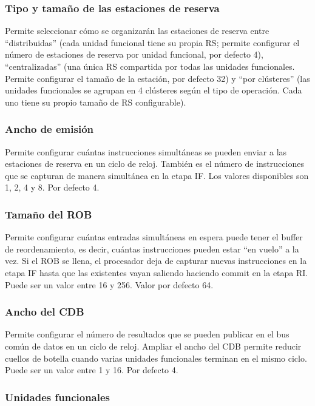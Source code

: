 \documentclass[../main.tex]{subfiles}
\begin{document}
\subsubsection*{Tipo y tamaño de las estaciones de reserva}

Permite seleccionar cómo se organizarán las estaciones de reserva entre ``distribuidas'' (cada unidad funcional tiene su propia RS; permite configurar el número de estaciones de reserva por unidad funcional, por defecto 4), ``centralizadas'' (una única RS compartida por todas las unidades funcionales. Permite configurar el tamaño de la estación, por defecto 32) y ``por clústeres'' (las unidades funcionales se agrupan en 4 clústeres según el tipo de operación. Cada uno tiene su propio tamaño de RS configurable).

\subsubsection*{Ancho de emisión}

Permite configurar cuántas instrucciones simultáneas se pueden enviar a las estaciones de reserva en un ciclo de reloj. También es el número de instrucciones que se capturan de manera simultánea en la etapa IF. Los valores disponibles son 1, 2, 4 y 8. Por defecto 4.

\subsubsection*{Tamaño del ROB}

Permite configurar cuántas entradas simultáneas en espera puede tener el buffer de reordenamiento, es decir, cuántas instrucciones pueden estar ``en vuelo'' a la vez. Si el ROB se llena, el procesador deja de capturar nuevas instrucciones en la etapa IF hasta que las existentes vayan saliendo haciendo commit en la etapa RI. Puede ser un valor entre 16 y 256. Valor por defecto 64.

\subsubsection*{Ancho del CDB}

Permite configurar el número de resultados que se pueden publicar en el bus común de datos en un ciclo de reloj. Ampliar el ancho del CDB permite reducir cuellos de botella cuando varias unidades funcionales terminan en el mismo ciclo. Puede ser un valor entre 1 y 16. Por defecto 4.

\subsubsection*{Unidades funcionales}
\end{document}
